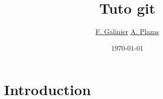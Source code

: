 \usepackage{listings}
\usepackage{hyperref}
\usepackage{verbatim}

\title{\textbf{Tuto git}}
\author{
  \href{mailto:florian.galinier@etud.univ-montp2.fr}{F. Galinier}
  \href{mailto:adrien.plazas@etud.univ-montp2.fr}{A. Plazas}
}
\date{\today}



\begin{frame}
\titlepage
\end{frame}

\section{Introduction}



